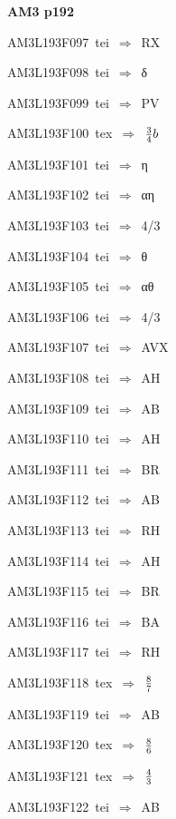 \par\vfill\eject
{\bf\hfill AM3 p192\hfill\hbox{}}\par\bigskip
{\sixrm AM3L193F097\ {\sixit tei}\ }$\Rightarrow$\ RX\par\smallskip
{\sixrm AM3L193F098\ {\sixit tei}\ }$\Rightarrow$\ δ\par\smallskip
{\sixrm AM3L193F099\ {\sixit tei}\ }$\Rightarrow$\ PV\par\smallskip
{\sixrm AM3L193F100\ {\sixit tex}\ }$\Rightarrow$\ ${{3\over 4}}b$\par\smallskip
{\sixrm AM3L193F101\ {\sixit tei}\ }$\Rightarrow$\ η\par\smallskip
{\sixrm AM3L193F102\ {\sixit tei}\ }$\Rightarrow$\ αη\par\smallskip
{\sixrm AM3L193F103\ {\sixit tei}\ }$\Rightarrow$\ 4/3\par\smallskip
{\sixrm AM3L193F104\ {\sixit tei}\ }$\Rightarrow$\ θ\par\smallskip
{\sixrm AM3L193F105\ {\sixit tei}\ }$\Rightarrow$\ αθ\par\smallskip
{\sixrm AM3L193F106\ {\sixit tei}\ }$\Rightarrow$\ 4/3\par\smallskip
{\sixrm AM3L193F107\ {\sixit tei}\ }$\Rightarrow$\ AVX\par\smallskip
{\sixrm AM3L193F108\ {\sixit tei}\ }$\Rightarrow$\ AH\par\smallskip
{\sixrm AM3L193F109\ {\sixit tei}\ }$\Rightarrow$\ AB\par\smallskip
{\sixrm AM3L193F110\ {\sixit tei}\ }$\Rightarrow$\ AH\par\smallskip
{\sixrm AM3L193F111\ {\sixit tei}\ }$\Rightarrow$\ BR\par\smallskip
{\sixrm AM3L193F112\ {\sixit tei}\ }$\Rightarrow$\ AB\par\smallskip
{\sixrm AM3L193F113\ {\sixit tei}\ }$\Rightarrow$\ RH\par\smallskip
{\sixrm AM3L193F114\ {\sixit tei}\ }$\Rightarrow$\ AH\par\smallskip
{\sixrm AM3L193F115\ {\sixit tei}\ }$\Rightarrow$\ BR\par\smallskip
{\sixrm AM3L193F116\ {\sixit tei}\ }$\Rightarrow$\ BA\par\smallskip
{\sixrm AM3L193F117\ {\sixit tei}\ }$\Rightarrow$\ RH\par\smallskip
{\sixrm AM3L193F118\ {\sixit tex}\ }$\Rightarrow$\ ${8\over 7}$\par\smallskip
{\sixrm AM3L193F119\ {\sixit tei}\ }$\Rightarrow$\ AB\par\smallskip
{\sixrm AM3L193F120\ {\sixit tex}\ }$\Rightarrow$\ ${8\over 6}$\par\smallskip
{\sixrm AM3L193F121\ {\sixit tex}\ }$\Rightarrow$\ ${4\over 3}$\par\smallskip
{\sixrm AM3L193F122\ {\sixit tei}\ }$\Rightarrow$\ AB\par\smallskip

